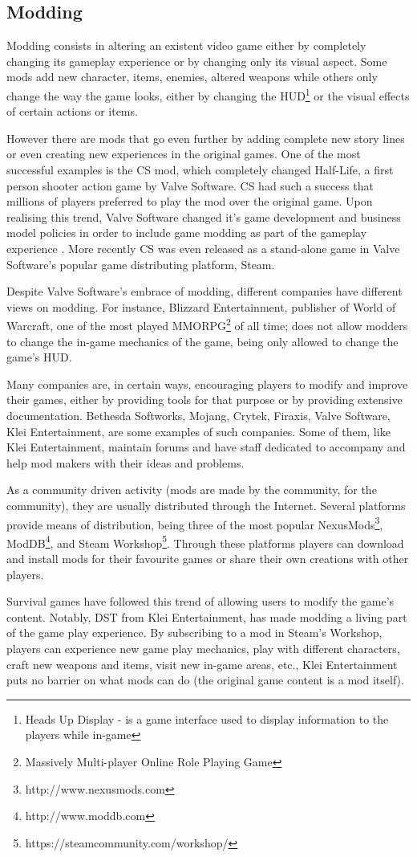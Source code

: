 \subsection{Modding}
Modding consists in altering an existent video game either by completely changing its gameplay experience or by changing only its visual aspect.
Some mods add new character, items, enemies, altered weapons while others only change the way the game looks, either by changing the \ac{HUD}\footnote{Heads Up Display - is a game interface used to display information to the players while in-game} or the visual effects of certain actions or items.

However there are mods that go even further by adding complete new story lines or even creating new experiences in the original games.
One of the most successful examples is the \ac{CS} mod, which completely changed Half-Life, a first person shooter action game by Valve Software.
\ac{CS} had such a success that millions of players preferred to play the mod over the original game.
Upon realising this trend, Valve Software changed it's game development and business model policies in order to include game modding as part of the gameplay experience \cite{scacchi:mods}.
More recently \ac{CS} was even released as a stand-alone game in Valve Software's popular game distributing platform, Steam.

Despite Valve Software's embrace of modding, different companies have different views on modding.
For instance, Blizzard Entertainment, publisher of World of Warcraft, one of the most played MMORPG\footnote{Massively Multi-player Online Role Playing Game} of all time; does not allow modders to change the in-game mechanics of the game, being only allowed to change the game's \ac{HUD}.

Many companies are, in certain ways, encouraging players to modify and improve their games, either by providing tools for that purpose or by providing extensive documentation.
Bethesda Softworks, Mojang, Crytek, Firaxis, Valve Software, Klei Entertainment, are some examples of such companies.
Some of them, like Klei Entertainment, maintain forums and have staff dedicated to accompany and help mod makers with their ideas and problems.

As a community driven activity (mods are made by the community, for the community), they are usually distributed through the Internet.
Several platforms provide means of distribution, being three of the most popular NexusMods\footnote{http://www.nexusmods.com}, ModDB\footnote{http://www.moddb.com}, and Steam Workshop\footnote{https://steamcommunity.com/workshop/}.
Through these platforms players can download and install mods for their favourite games or share their own creations with other players.

Survival games have followed this trend of allowing users to modify the game's content.
Notably, \ac{DST} from Klei Entertainment, has made modding a living part of the game play experience.
By subscribing to a mod in Steam's Workshop, players can experience new game play mechanics, play with different characters, craft new weapons and items, visit new in-game areas, etc., Klei Entertainment puts no barrier on what mods can do (the original game content is a mod itself).

